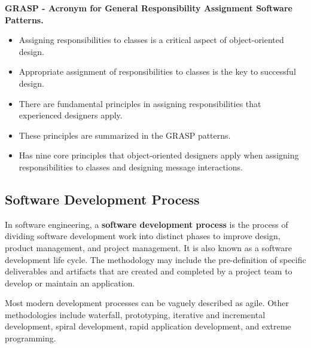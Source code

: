 \documentclass[12pt,a4paper,titlepage]{article}
\begin{document}
\textbf{GRASP - Acronym for General Responsibility Assignment Software Patterns.}
\begin{itemize}
	\item Assigning responsibilities to classes is a critical aspect of object-oriented design.
	\item Appropriate assignment of responsibilities to classes is the key to successful design.
	\item There are fundamental principles in assigning responsibilities that experienced designers apply.
	\item These principles are summarized in the GRASP patterns.
	\item Has nine core principles that object-oriented designers apply when assigning responsibilities to classes and designing message interactions.
\end{itemize}

\subsection{Software Development Process}
In software engineering, a \textbf{software development process} is the process of dividing software development work into distinct phases to improve design, product management, and project management. It is also known as a software development life cycle. The methodology may include the pre-definition of specific deliverables and artifacts that are created and completed by a project team to develop or maintain an application.\par
Most modern development processes can be vaguely described as agile. Other methodologies include waterfall, prototyping, iterative and incremental development, spiral development, rapid application development, and extreme programming.\par
\end{document}
